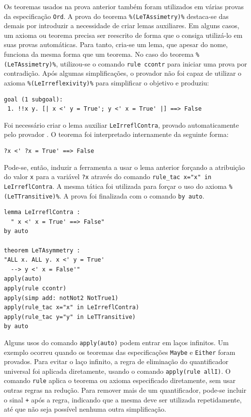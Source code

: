 Os teoremas usados na prova anterior também foram utilizados em várias provas da especificação \Verb.Ord..
A prova do teorema \Verb.%(LeTAssimetry)%. destaca-se das demais por introduzir a necessidade de criar lemas auxiliares.
Em alguns casos, um axioma ou teorema precisa ser reescrito de forma que o \Isabelle consiga utilizá-lo em suas provas automáticas.
Para tanto, cria-se um lema, que apesar do nome, funciona da mesma forma que um teorema.
No caso do teorema \Verb.%(LeTAssimetry)%., utilizou-se o comando \Verb.rule ccontr. para iniciar uma prova por contradição.
Após algumas simplificações, o provador \Isabelle não foi capaz de utilizar o axioma \Verb.%(LeIrreflexivity)%. para simplificar o objetivo e produziu:

\begin{Verbatim}
goal (1 subgoal):
 1. !!x y. [| x <' y = True'; y <' x = True' |] ==> False
\end{Verbatim}

Foi necessário criar o lema auxiliar \Verb.LeIrreflContra., provado automaticamente pelo provador \Isabelle.
O teorema foi interpretado internamente da seguinte forma:

\begin{Verbatim}
?x <' ?x = True' ==> False
\end{Verbatim}

Pode-se, então, induzir a ferramenta \Isabelle a usar o lema anterior forçando a atribuição do valor \Verb.x. para a variável \Verb.?x. através do comando \Verb.rule_tac x="x" in LeIrreflContra..
A mesma tática foi utilizada para forçar o uso do axioma \Verb.%(LeTTransitive)%..
A prova foi finalizada com o comando \Verb.by auto..

\begin{Verbatim}
lemma LeIrreflContra :
  " x <' x = True' ==> False"
by auto

theorem LeTAsymmetry :
"ALL x. ALL y. x <' y = True'
  --> y <' x = False'"
apply(auto)
apply(rule ccontr)
apply(simp add: notNot2 NotTrue1)
apply(rule_tac x="x" in LeIrreflContra)
apply(rule_tac y="y" in LeTTransitive)
by auto
\end{Verbatim}

Alguns usos do comando \Verb.apply(auto). podem entrar em laços infinitos.
Um exemplo ocorreu quando os teoremas das especificações \Verb.Maybe. e \Verb.Either. foram provados.
Para evitar o laço infinito, a regra de eliminação do quantificador universal foi aplicada diretamente, usando o comando \Verb.apply(rule allI)..
O comando \Verb.rule. aplica o teorema ou axioma especificado diretamente, sem usar outras regras na redução.
Para remover mais de um quantificador, pode-se incluir o sinal \Verb.+. após a regra, indicando que a mesma deve ser utilizada repetidamente, até que não seja possível nenhuma outra simplificação.

